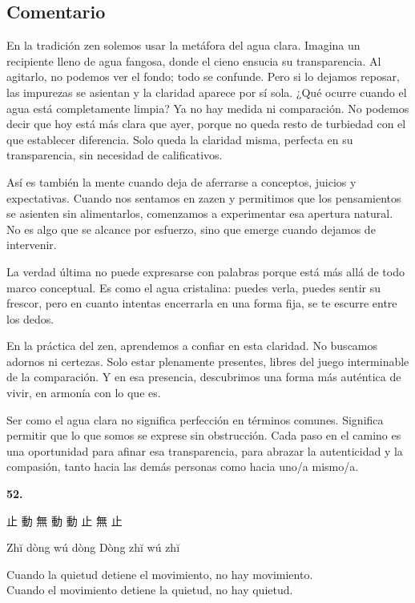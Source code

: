 \documentclass[
  a5paperpaper,
]{article}
\begin{document}
\hfill\break

\hypertarget{comentario-50}{%
\subsection{Comentario}\label{comentario-50}}

En la tradición zen solemos usar la metáfora del agua clara. Imagina un
recipiente lleno de agua fangosa, donde el cieno ensucia su
transparencia. Al agitarlo, no podemos ver el fondo; todo se confunde.
Pero si lo dejamos reposar, las impurezas se asientan y la claridad
aparece por sí sola. ¿Qué ocurre cuando el agua está completamente
limpia? Ya no hay medida ni comparación. No podemos decir que hoy está
más clara que ayer, porque no queda resto de turbiedad con el que
establecer diferencia. Solo queda la claridad misma, perfecta en su
transparencia, sin necesidad de calificativos.

Así es también la mente cuando deja de aferrarse a conceptos, juicios y
expectativas. Cuando nos sentamos en zazen y permitimos que los
pensamientos se asienten sin alimentarlos, comenzamos a experimentar esa
apertura natural. No es algo que se alcance por esfuerzo, sino que
emerge cuando dejamos de intervenir.

La verdad última no puede expresarse con palabras porque está más allá
de todo marco conceptual. Es como el agua cristalina: puedes verla,
puedes sentir su frescor, pero en cuanto intentas encerrarla en una
forma fija, se te escurre entre los dedos.

En la práctica del zen, aprendemos a confiar en esta claridad. No
buscamos adornos ni certezas. Solo estar plenamente presentes, libres
del juego interminable de la comparación. Y en esa presencia,
descubrimos una forma más auténtica de vivir, en armonía con lo que es.

Ser como el agua clara no significa perfección en términos comunes.
Significa permitir que lo que somos se exprese sin obstrucción. Cada
paso en el camino es una oportunidad para afinar esa transparencia, para
abrazar la autenticidad y la compasión, tanto hacia las demás personas
como hacia uno/a mismo/a.

\hfill\break

\hypertarget{02}{}
\begin{verseblock}

\newpage

\begin{center}\textbf{52.}\end{center}

止 動 無 動 動 止 無 止

Zhĭ dòng wú dòng Dòng zhĭ wú zhĭ

Cuando la quietud detiene el movimiento, no hay movimiento.\\
Cuando el movimiento detiene la quietud, no hay quietud.

\end{verseblock}
\end{document}
